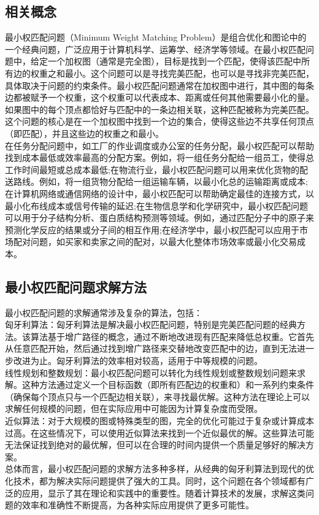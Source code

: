 \documentclass{NauThesis}
\begin{document}
\subsection{相关概念}
最小权匹配问题（Minimum Weight Matching Problem）是组合优化和图论中的一个经典问题，广泛应用于计算机科学、运筹学、经济学等领域。在最小权匹配问题中，给定一个加权图（通常是完全图），目标是找到一个匹配，使得该匹配中所有边的权重之和最小。这个问题可以是寻找完美匹配，也可以是寻找非完美匹配，具体取决于问题的约束条件。最小权匹配问题通常在加权图中进行，其中图的每条边都被赋予一个权重，这个权重可以代表成本、距离或任何其他需要最小化的量。如果图中的每个顶点都恰好与匹配中的一条边相关联，这种匹配被称为完美匹配。这个问题的核心是在一个加权图中找到一个边的集合，使得这些边不共享任何顶点（即匹配），并且这些边的权重之和最小。
\\\hspace*{2em}在任务分配问题中，如工厂的作业调度或办公室的任务分配，最小权匹配可以帮助找到成本最低或效率最高的分配方案。例如，将一组任务分配给一组员工，使得总工作时间最短或总成本最低;在物流行业，最小权匹配问题可以用来优化货物的配送路线。例如，将一组货物分配给一组运输车辆，以最小化总的运输距离或成本;在计算机网络或通信网络的设计中，最小权匹配可以帮助确定最佳的连接方式，以最小化布线成本或信号传输的延迟;在生物信息学和化学研究中，最小权匹配问题可以用于分子结构分析、蛋白质结构预测等领域。例如，通过匹配分子中的原子来预测化学反应的结果或分子间的相互作用;在经济学中，最小权匹配可以应用于市场配对问题，如买家和卖家之间的配对，以最大化整体市场效率或最小化交易成本。
\subsection{最小权匹配问题求解方法}
最小权匹配问题的求解通常涉及复杂的算法，包括：
\\\hspace*{2em}匈牙利算法：匈牙利算法是解决最小权匹配问题，特别是完美匹配问题的经典方法。该算法基于增广路径的概念，通过不断地改进现有匹配来降低总权重。它首先从任意匹配开始，然后通过找到增广路径来交替地改变匹配中的边，直到无法进一步改进为止。匈牙利算法的效率相对较高，适用于中等规模的问题。
\\\hspace*{2em}线性规划和整数规划：最小权匹配问题可以转化为线性规划或整数规划问题来求解。这种方法通过定义一个目标函数（即所有匹配边的权重和）和一系列约束条件（确保每个顶点只与一个匹配边相关联），来寻找最优解。这种方法在理论上可以求解任何规模的问题，但在实际应用中可能因为计算复杂度而受限。
\\\hspace*{2em}近似算法：对于大规模的图或特殊类型的图，完全的优化可能过于复杂或计算成本过高。在这些情况下，可以使用近似算法来找到一个近似最优的解。这些算法可能无法保证找到绝对的最优解，但可以在合理的时间内提供一个质量足够好的解决方案。
\\\hspace*{2em}总体而言，最小权匹配问题的求解方法多种多样，从经典的匈牙利算法到现代的优化技术，都为解决实际问题提供了强大的工具。同时，这个问题在各个领域都有广泛的应用，显示了其在理论和实践中的重要性。随着计算技术的发展，求解这类问题的效率和准确性不断提高，为各种实际应用提供了更多可能性。
\end{document}

